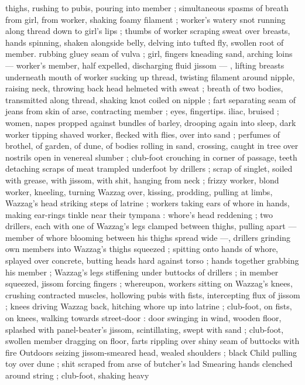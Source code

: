 thighs, rushing to pubis, pouring into member ; simultaneous spasms 
of breath from girl, from worker, shaking foamy filament ; worker's 
watery snot running along thread down to girl's lips ; thumbs of 
worker scraping sweat over breasts, hands spinning, shaken 
alongside belly, delving into tufted fly, swollen root of member. 
rubbing gluey seam of vulva ; girl, fingers kneading sand, arching 
loins --- worker's member, half expelled, discharging fluid jissom --- 
, lifting breasts underneath mouth of worker sucking up thread, 
twisting filament around nipple, raising neck, throwing back head 
helmeted with sweat ; breath of two bodies, transmitted along 
thread, shaking knot coiled on nipple ; fart separating seam of jeans 
from skin of arse, contracting member ; eyes, fingertips. iliac, 
bruised ; women, napes propped against bundles of barley, drooping 
again into sleep, dark worker tipping shaved worker, flecked with 
flies, over into sand ; perfumes of brothel, of garden, of dune, of 
bodies rolling in sand, crossing, caught in tree over nostrils open in 
venereal slumber ; club-foot crouching in corner of passage, teeth 
detaching scraps of meat trampled underfoot by drillers ; scrap of 
singlet, soiled with grease, with jissom, with shit, hanging from neck 
; frizzy worker, blond worker, kneeling, turning Wazzag over, kissing, 
prodding, pulling at limbs, Wazzag's head striking steps of latrine ; 
workers taking ears of whore in hands, making ear-rings tinkle near 
their tympana : whore's head reddening ; two drillers, each with one 
of Wazzag's legs clamped between thighs, pulling apart --- member 
of whore blooming between his thighs spread wide ---, drillers 
grinding own members into Wazzag's thighs squeezed ; spitting onto 
hands of whore, splayed over concrete, butting heads hard against 
torso ; hands together grabbing his member ; Wazzag's legs 
stiffening under buttocks of drillers ; in member squeezed, jissom 
forcing fingers ; whereupon, workers sitting on Wazzag's knees, 
crushing contracted muscles, hollowing pubis with fists, intercepting 
flux of jissom ; knees driving Wazzag back, hitching whore up into 
latrine ; club-foot, on fists, on knees, walking towards street-door : 
door swinging in wind, wooden floor, splashed with panel-beater's 
jissom, scintillating, swept with sand ; club-foot, swollen member 
dragging on floor, farts rippling over shiny seam of buttocks with fire 
Outdoors seizing jissom-smeared head, wealed shoulders ; black 
Child pulling toy over dune ; shit scraped from arse of butcher's lad 
Smearing hands clenched around string ; club-foot, shaking heavy 
